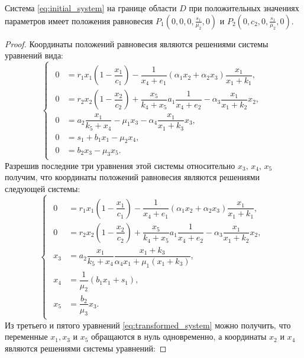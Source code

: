 \documentclass[14pt,a4paper]{extarticle}
\begin{document}
	\begin{theorem}\label{th:border_eqpoints}
		Система \ref{eq:initial_system} на границе области $D$ при положительных значениях параметров имеет положения равновесия $P_1\left(0,0,0,\frac{s_1}{\mu_2},0\right)$ и $P_2\left(0,c_2,0,\frac{s_1}{\mu_2},0\right)$. 
	\end{theorem}
	\begin{proof}
		Координаты положений равновесия являются решениями системы уравнений вида:
		\begin{equation}
			\begin{cases}
				\begin{aligned}
					0 &= r_1x_1\left(1-\dfrac{x_1}{c_1}\right)-\dfrac{1}{x_4+e_1}(\alpha_1x_2+\alpha_2x_3)\dfrac{x_1}{x_1+k_1},\\
					0 &= r_2x_2\left(1-\dfrac{x_2}{c_2}\right)+\dfrac{x_5}{k_4+x_5}a_1\dfrac{1}{x_4+e_2}-\alpha_3\dfrac{x_1}{x_1+k_2}x_2,\\
					0 &= a_2\dfrac{x_1}{k_5+x_4}-\mu_1x_3-\alpha_4\dfrac{x_1}{x_1+k_3}x_3,\\
					0 &= s_1 + b_1x_1-\mu_2x_4,\\
					0 &= b_2x_3-\mu_3x_5.
				\end{aligned}
			\end{cases}\label{eq:eqilibrium_points}
		\end{equation}
		Разрешив последние три уравнения этой системы относительно $x_3,\, x_4,\, x_5$ получим, что координаты положений равновесия являются решениями следующей системы:
		\begin{equation}
			\begin{cases}
				\begin{aligned}
					0 &= r_1x_1\left(1-\dfrac{x_1}{c_1}\right)-\dfrac{1}{x_4+e_1}(\alpha_1x_2+\alpha_2x_3)\dfrac{x_1}{x_1+k_1},\\
					0 &= r_2x_2\left(1-\dfrac{x_2}{c_2}\right)+\dfrac{x_5}{k_4+x_5}a_1\dfrac{1}{x_4+e_2}-\alpha_3\dfrac{x_1}{x_1+k_2}x_2,\\
					x_3 &= a_2\dfrac{x_1}{k_5+x_4}\dfrac{x_1+k_3}{\alpha_4x_1+\mu_1(x_1+k_3)},\\
					x_4 &= \dfrac{1}{\mu_2}\left(b_1x_1+s_1\right),\\
					x_5 &= \dfrac{b_2}{\mu_3}x_3.
				\end{aligned}
			\end{cases}\label{eq:transformed_system}
		\end{equation}
		Из третьего и пятого уравнений \ref{eq:transformed_system} можно получить, что переменные $x_1, x_3$ и $x_5$ обращаются в нуль одновременно, а координаты $x_2$ и $x_4$ являются решениями системы уравнений:

\end{proof}
\end{document}
